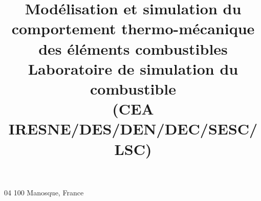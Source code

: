 \setlength{\hintscolumnwidth}{1cm}
\title{Modélisation et simulation du comportement thermo-mécanique
  des éléments combustibles\\ Laboratoire de simulation du combustible\\
  (CEA IRESNE/DES/DEN/DEC/SESC/LSC)}
\address{749 avenue des Savels}{04 100 Manosque, France}
\renewcommand{\labelitemi}{$\blacksquare$}
